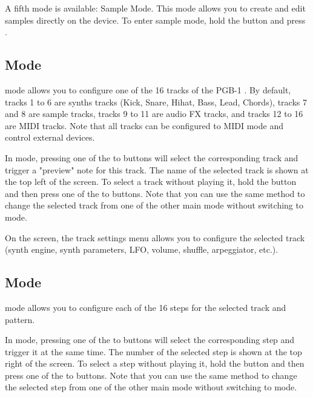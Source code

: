\documentclass[8pt]{extarticle}
\def\device{PGB-1 }
\begin{document}
\begin{multicols*}{3}
\begin{notes}
    \item A fifth mode is available: Sample Mode. This mode allows you to create and edit samples directly on the device. To enter sample mode, hold the  button and press .
\end{notes}

\subsection{ Mode}

 mode allows you to configure one of the 16 tracks of the \device. By default, tracks 1 to 6 are synths tracks (Kick, Snare, Hihat, Bass, Lead, Chords), tracks 7 and 8 are sample tracks, tracks 9 to 11 are audio FX tracks, and tracks 12 to 16 are MIDI tracks. Note that all tracks can be configured to MIDI mode and control external devices.

In  mode, pressing one of the  to  buttons will select the corresponding track and trigger a "preview" note for this track. The name of the selected track is shown at the top left of the screen. To select a track without playing it, hold the  button and then press one of the  to  buttons. Note that you can use the same method to change the selected track from one of the other main mode without switching to  mode.

On the screen, the track settings menu allows you to configure the selected track (synth engine, synth parameters, LFO, volume, shuffle, arpeggiator, etc.).

\subsection{ Mode}

 mode allows you to configure each of the 16 steps for the selected track and pattern. 

In  mode, pressing one of the  to  buttons will select the corresponding step and trigger it at the same time. The number of the selected step is shown at the top right of the screen. To select a step without playing it, hold the  button and then press one of the  to  buttons. Note that you can use the same method to change the selected step from one of the other main mode without switching to  mode.


\end{multicols*}
\end{document}
